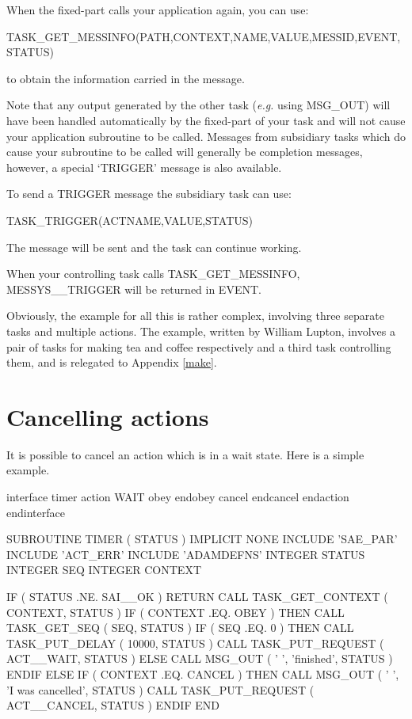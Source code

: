 \documentclass[twoside,11pt,nolof]{starlink}
\begin{document}
When the fixed-part calls your application again, you can use:
\begin{small}
\begin{terminalv}
TASK_GET_MESSINFO(PATH,CONTEXT,NAME,VALUE,MESSID,EVENT,STATUS)
\end{terminalv}
\end{small}
to obtain the information carried in the message.

Note that any output generated by the other task (\emph{e.g.} using MSG\_OUT)
will have been handled automatically by the fixed-part of your task and will
not cause your application subroutine to be called.
Messages from subsidiary tasks which do cause your subroutine to be called
will generally be completion messages, however, a special `TRIGGER' message is
also available.

To send a TRIGGER message the subsidiary task can use:
\begin{small}
\begin{terminalv}
TASK_TRIGGER(ACTNAME,VALUE,STATUS)
\end{terminalv}
\end{small}
The message will be sent and the task can continue working.

When your controlling task calls TASK\_GET\_MESSINFO, MESSYS\_\_TRIGGER will
be returned in EVENT.

Obviously, the example for all this is rather complex, involving three
separate tasks and multiple actions. The example, written by William
Lupton, involves a pair of tasks for making tea and coffee respectively
and a third task controlling them, and is relegated to Appendix \ref{make}.

\section{Cancelling actions}

It is possible to cancel an action which is in a wait state. Here is a
simple example.

\begin{small}
\begin{terminalv}
interface timer
   action WAIT
      obey
      endobey
      cancel
      endcancel
   endaction
endinterface

      SUBROUTINE TIMER ( STATUS )
      IMPLICIT NONE
      INCLUDE 'SAE_PAR'
      INCLUDE 'ACT_ERR'
      INCLUDE 'ADAMDEFNS'
      INTEGER STATUS
      INTEGER SEQ
      INTEGER CONTEXT

      IF ( STATUS .NE. SAI__OK ) RETURN
      CALL TASK_GET_CONTEXT ( CONTEXT, STATUS )
      IF ( CONTEXT .EQ. OBEY ) THEN
         CALL TASK_GET_SEQ ( SEQ, STATUS )
         IF ( SEQ .EQ. 0 ) THEN
            CALL TASK_PUT_DELAY ( 10000, STATUS )
            CALL TASK_PUT_REQUEST ( ACT__WAIT, STATUS )
         ELSE
            CALL MSG_OUT ( ' ', 'finished', STATUS )
         ENDIF
      ELSE IF ( CONTEXT .EQ. CANCEL ) THEN
         CALL MSG_OUT ( ' ', 'I was cancelled', STATUS )
         CALL TASK_PUT_REQUEST ( ACT__CANCEL, STATUS )
      ENDIF
      END
\end{terminalv}
\end{small}
\end{document}
